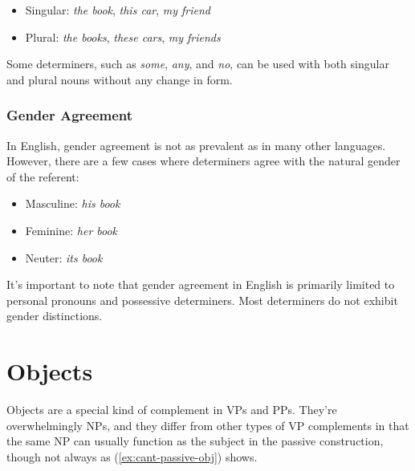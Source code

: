 \begin{itemize}[noitemsep]
   \item Singular: \textit{the book}, \textit{this car}, \textit{my friend}
   \item Plural: \textit{the books}, \textit{these cars}, \textit{my friends}
\end{itemize}

Some determiners, such as \textit{some}, \textit{any}, and \textit{no}, can be used with both singular and plural nouns without any change in form.

\subsubsection{Gender Agreement}
In English, gender agreement is not as prevalent as in many other languages. However, there are a few cases where determiners agree with the natural gender of the referent:

\begin{itemize}[noitemsep]
   \item Masculine: \textit{his book}
   \item Feminine: \textit{her book}
   \item Neuter: \textit{its book}
\end{itemize}

It's important to note that gender agreement in English is primarily limited to personal pronouns and possessive determiners. Most determiners do not exhibit gender distinctions.

\section{Objects}

Objects are a special kind of complement in VPs and PPs. They're overwhelmingly NPs, and they differ from other types of VP complements in that the same NP can usually function as the subject in the passive construction, though not always as (\ref{ex:cant-passive-obj}) shows.

\ea
    \z
\z
\ea \label{ex:cant-passive-obj}
    \z
\z
\ea
    \z
\z

